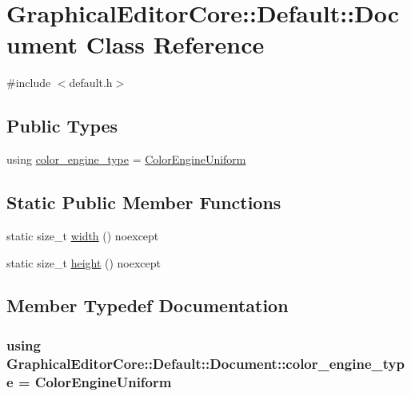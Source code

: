 \hypertarget{classGraphicalEditorCore_1_1Default_1_1Document}{}\section{Graphical\+Editor\+Core\+:\+:Default\+:\+:Document Class Reference}
\label{classGraphicalEditorCore_1_1Default_1_1Document}


{\ttfamily \#include $<$default.\+h$>$}

\subsection*{Public Types}
\begin{DoxyCompactItemize}
\item 
using \hyperlink{classGraphicalEditorCore_1_1Default_1_1Document_a43bd2bf922153e38e422042d1bd3b9a0}{color\+\_\+engine\+\_\+type} = \hyperlink{classGraphicalEditorCore_1_1ColorEngineUniform}{Color\+Engine\+Uniform}
\end{DoxyCompactItemize}
\subsection*{Static Public Member Functions}
\begin{DoxyCompactItemize}
\item 
static size\+\_\+t \hyperlink{classGraphicalEditorCore_1_1Default_1_1Document_a15c6ae336d06e55c62978fd9e92aed49}{width} () noexcept
\item 
static size\+\_\+t \hyperlink{classGraphicalEditorCore_1_1Default_1_1Document_ac92a824f57f7e8376c86426682875669}{height} () noexcept
\end{DoxyCompactItemize}


\subsection{Member Typedef Documentation}
\subsubsection[{\texorpdfstring{color\+\_\+engine\+\_\+type}{color_engine_type}}]{\setlength{\rightskip}{0pt plus 5cm}using {\bf Graphical\+Editor\+Core\+::\+Default\+::\+Document\+::color\+\_\+engine\+\_\+type} =  {\bf Color\+Engine\+Uniform}}\hypertarget{classGraphicalEditorCore_1_1Default_1_1Document_a43bd2bf922153e38e422042d1bd3b9a0}{}\label{classGraphicalEditorCore_1_1Default_1_1Document_a43bd2bf922153e38e422042d1bd3b9a0}


